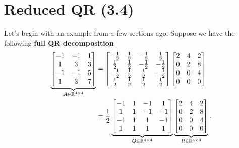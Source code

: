 \documentclass[letterpaper]{article}
\newcommand{\0}{\mathbf{0}}
\begin{document}
\section{Reduced QR (3.4)}
Let's begin with an example from a few sections ago. Suppose we have the following \textbf{full QR decomposition}
\begin{equation*}
    \begin{aligned}
        \underbrace{\begin{bmatrix}
            -1 & -1 & 1 \\ 
            1 & 3 & 3 \\ 
            -1 & -1 & 5 \\ 
            1 & 3 & 7
        \end{bmatrix}}_{A \in \mathbb{R}^{4 \times 4}} &= \begin{bmatrix}
            -\frac{1}{2} & \frac{1}{2} & -\frac{1}{2} & \frac{1}{2} \\ 
            \frac{1}{2} & \frac{1}{2} & -\frac{1}{2} & -\frac{1}{2} \\ 
            -\frac{1}{2} & \frac{1}{2} & \frac{1}{2} & -\frac{1}{2} \\ 
            \frac{1}{2} & \frac{1}{2} & \frac{1}{2} & \frac{1}{2}
        \end{bmatrix} \begin{bmatrix}
            2 & 4 & 2 \\ 
            0 & 2 & 8 \\ 
            0 & 0 & 4 \\ 
            0 & 0 & 0
        \end{bmatrix} \\ 
            &= \frac{1}{2} \underbrace{\begin{bmatrix}
                -1 & 1 & -1 & 1 \\ 
                1 & 1 & -1 & -1 \\ 
                -1 & 1 & 1 & -1 \\ 
                1 & 1 & 1 & 1
            \end{bmatrix}}_{Q \in \mathbb{R}^{4 \times 4}} \underbrace{\begin{bmatrix}
                2 & 4 & 2 \\ 
                0 & 2 & 8 \\ 
                0 & 0 & 4 \\ 
                0 & 0 & 0
            \end{bmatrix}}_{R \in \mathbb{R}^{4 \times 3}}.
    \end{aligned}
\end{equation*}
\end{document}
